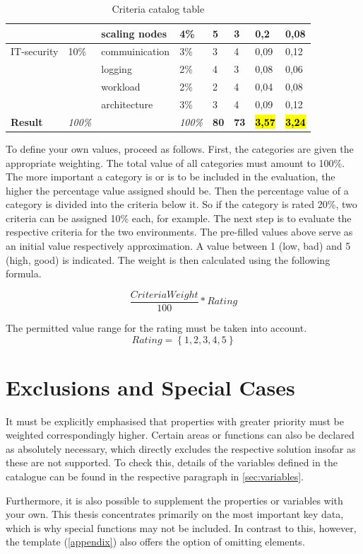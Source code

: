 \documentclass[MSC,Master,english]{twbook}%
\begin{document}
\begin{table}[ht]
\begin{center}
{\begin{tabular}{|l|l|l|l|l|l|l|l|}
            & & scaling nodes & 4\% & 5 & 3 & 0,2 & 0,08 \\
            \hline
            IT-security & 10\% & commuinication & 3\% & 3 & 4 & 0,09 & 0,12 \\
            & & logging & 2\% & 4 & 3 & 0,08 & 0,06  \\
            & & workload & 2\% & 2 & 4 & 0,04 & 0,08 \\
            & & architecture & 3\% & 3 & 4 & 0,09 & 0,12 \\
            \hline \hline
            \textbf{Result} & \textit{100\%} & & \textit{100\%} & \textbf{80} & \textbf{73} & \hl{\textbf{3,57}} & \hl{\textbf{3,24}} \\
            \hline
        \end{tabular}}
        \caption{Criteria catalog table}
        \label{tab:cct}
    \end{center}
\end{table}
To define your own values, proceed as follows. First, the categories are given the appropriate weighting. The total value of all categories must amount to 100\%. The more important a category is or is to be included in the evaluation, the higher the percentage value assigned should be. Then the percentage value of a category is divided into the criteria below it. So if the category is rated 20\%, two criteria can be assigned 10\% each, for example. The next step is to evaluate the respective criteria for the two environments. The pre-filled values above serve as an initial value respectively approximation. A value between 1 (low, bad) and 5 (high, good) is indicated. The weight is then calculated using the following formula.

\begin{equation*}
    \frac{CriteriaWeight}{100}*Rating
\end{equation*}

The permitted value range for the rating must be taken into account.
\begin{equation*}
    Rating = \left\{1,2,3,4,5  \right\}
\end{equation*}

\section{Exclusions and Special Cases}
\label{sec:exclusions}
It must be explicitly emphasised that properties with greater priority must be weighted correspondingly higher. Certain areas or functions can also be declared as absolutely necessary, which directly excludes the respective solution insofar as these are not supported. To check this, details of the variables defined in the catalogue can be found in the respective paragraph in \autoref{sec:variables}. \par
Furthermore, it is also possible to supplement the properties or variables with your own. This thesis concentrates primarily on the most important key data, which is why special functions may not be included. In contrast to this, however, the template (\autoref{appendix}) also offers the option of omitting elements.
\end{document}
